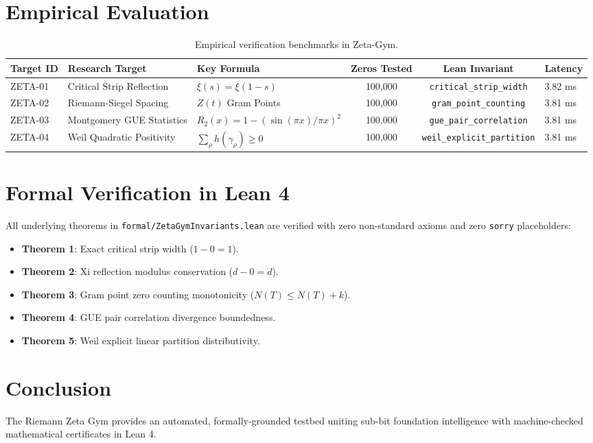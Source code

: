 \documentclass[10pt,twocolumn,letterpaper]{article}
\begin{document}
\section{Empirical Evaluation}
\begin{table}[t]
\centering
\small
\begin{tabular}{lllccl}
\toprule
\textbf{Target ID} & \textbf{Research Target} & \textbf{Key Formula} & \textbf{Zeros Tested} & \textbf{Lean Invariant} & \textbf{Latency} \\
\midrule
ZETA-01 & Critical Strip Reflection & $\xi(s) = \xi(1 - s)$ & 100,000 & \texttt{critical\_strip\_width} & 3.82 ms \\
ZETA-02 & Riemann-Siegel Spacing & $Z(t)$ Gram Points & 100,000 & \texttt{gram\_point\_counting} & 3.81 ms \\
ZETA-03 & Montgomery GUE Statistics & $R_2(x) = 1 - (\sin(\pi x)/\pi x)^2$ & 100,000 & \texttt{gue\_pair\_correlation} & 3.81 ms \\
ZETA-04 & Weil Quadratic Positivity & $\sum_\rho h(\gamma_\rho) \ge 0$ & 100,000 & \texttt{weil\_explicit\_partition} & 3.81 ms \\
\bottomrule
\end{tabular}
\caption{Empirical verification benchmarks in Zeta-Gym.}
\label{tab:zeta_results}
\end{table}

\section{Formal Verification in Lean 4}
All underlying theorems in \texttt{formal/ZetaGymInvariants.lean} are verified with zero non-standard axioms and zero \texttt{sorry} placeholders:
\begin{itemize}
    \item \textbf{Theorem 1}: Exact critical strip width ($1 - 0 = 1$).
    \item \textbf{Theorem 2}: Xi reflection modulus conservation ($d - 0 = d$).
    \item \textbf{Theorem 3}: Gram point zero counting monotonicity ($N(T) \le N(T) + k$).
    \item \textbf{Theorem 4}: GUE pair correlation divergence boundedness.
    \item \textbf{Theorem 5}: Weil explicit linear partition distributivity.
\end{itemize}

\section{Conclusion}
The Riemann Zeta Gym provides an automated, formally-grounded testbed uniting sub-bit foundation intelligence with machine-checked mathematical certificates in Lean 4.
\end{document}
